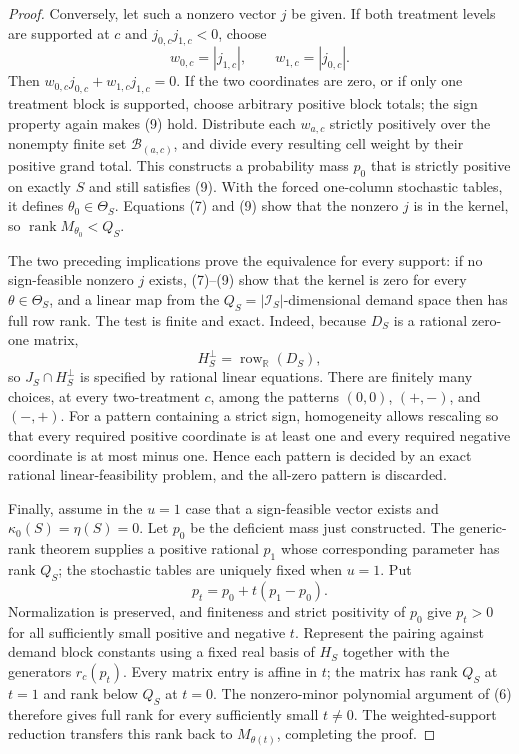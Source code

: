 \documentclass{article}
\begin{document}
\begin{proof}
Conversely, let such a nonzero vector \(j\) be given.  If both treatment levels are supported at \(c\) and \(j_{0,c}j_{1,c}<0\), choose
\[
w_{0,c}=|j_{1,c}|,
\qquad
w_{1,c}=|j_{0,c}|.
\tag{10}
\]
Then \(w_{0,c}j_{0,c}+w_{1,c}j_{1,c}=0\).  If the two coordinates are zero, or if only one treatment block is supported, choose arbitrary positive block totals; the sign property again makes (9) hold.  Distribute each \(w_{a,c}\) strictly positively over the nonempty finite set \(\mathcal B_{(a,c)}\), and divide every resulting cell weight by their positive grand total.  This constructs a probability mass \(p_0\) that is strictly positive on exactly \(S\) and still satisfies (9).  With the forced one-column stochastic tables, it defines \(\theta_0\in\Theta_S\).  Equations (7) and (9) show that the nonzero \(j\) is in the kernel, so \(\operatorname{rank}M_{\theta_0}<Q_S\).

The two preceding implications prove the equivalence for every support: if no sign-feasible nonzero \(j\) exists, (7)--(9) show that the kernel is zero for every \(\theta\in\Theta_S\), and a linear map from the \(Q_S=|\mathcal I_S|\)-dimensional demand space then has full row rank.  The test is finite and exact.  Indeed, because \(D_S\) is a rational zero-one matrix,
\[
H_S^\perp=\operatorname{row}_{\mathbb R}(D_S),
\tag{11}
\]
so \(J_S\cap H_S^\perp\) is specified by rational linear equations.  There are finitely many choices, at every two-treatment \(c\), among the patterns \((0,0)\), \((+,-)\), and \((-,+)\).  For a pattern containing a strict sign, homogeneity allows rescaling so that every required positive coordinate is at least one and every required negative coordinate is at most minus one.  Hence each pattern is decided by an exact rational linear-feasibility problem, and the all-zero pattern is discarded.

Finally, assume in the \(u=1\) case that a sign-feasible vector exists and \(\kappa_0(S)=\eta(S)=0\).  Let \(p_0\) be the deficient mass just constructed.  The generic-rank theorem supplies a positive rational \(p_1\) whose corresponding parameter has rank \(Q_S\); the stochastic tables are uniquely fixed when \(u=1\).  Put
\[
p_t=p_0+t(p_1-p_0).
\tag{12}
\]
Normalization is preserved, and finiteness and strict positivity of \(p_0\) give \(p_t>0\) for all sufficiently small positive and negative \(t\).  Represent the pairing against demand block constants using a fixed real basis of \(H_S\) together with the generators \(r_c(p_t)\).  Every matrix entry is affine in \(t\); the matrix has rank \(Q_S\) at \(t=1\) and rank below \(Q_S\) at \(t=0\).  The nonzero-minor polynomial argument of (6) therefore gives full rank for every sufficiently small \(t\neq0\).  The weighted-support reduction transfers this rank back to \(M_{\theta(t)}\), completing the proof.
\end{proof}
\end{document}
